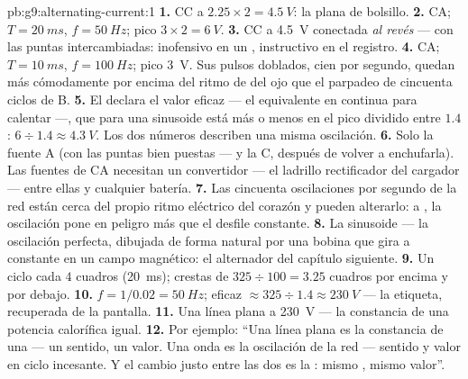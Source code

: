 \begin{solution}{pb:g9:alternating-current:1}
\textbf{1.} CC a $2.25 \times 2 = \qty{4.5}{V}$: la  plana de
bolsillo.
\textbf{2.} CA; $T = \qty{20}{ms}$, $f = \qty{50}{Hz}$; pico $3 \times
2 = \qty{6}{V}$.
\textbf{3.} CC a \qty{4.5}{V} conectada \emph{al revés} --- con las
puntas intercambiadas: inofensivo en un , instructivo en el
registro.
\textbf{4.} CA; $T = \qty{10}{ms}$, $f = \qty{100}{Hz}$; pico
\qty{3}{V}. Sus pulsos doblados, cien por segundo, quedan más
cómodamente por encima del ritmo de  del ojo que el parpadeo de
cincuenta ciclos de B.
\textbf{5.} El  declara el valor eficaz --- el
equivalente en continua para calentar ---, que para una sinusoide está
más o menos en el pico dividido entre $1.4$: $6 \div 1.4 \approx
\qty{4.3}{V}$. Los dos números describen una misma oscilación.
\textbf{6.} Solo la fuente A (con las puntas bien puestas --- y la C,
después de volver a enchufarla). Las fuentes de CA necesitan un
convertidor --- el ladrillo rectificador del cargador --- entre ellas y
cualquier batería.
\textbf{7.} Las cincuenta oscilaciones por segundo de la red están
cerca del propio ritmo eléctrico del corazón y pueden alterarlo:
 a , la oscilación pone en peligro más
que el desfile constante.
\textbf{8.} La sinusoide --- la oscilación perfecta, dibujada de forma
natural por una bobina que gira a  constante en un campo
magnético: el alternador del capítulo siguiente.
\textbf{9.} Un ciclo cada $4$ cuadros (\qty{20}{ms}); crestas de $325
\div 100 = 3.25$ cuadros por encima y por debajo.
\textbf{10.} $f = 1/0.02 = \qty{50}{Hz}$; eficaz $\approx 325 \div 1.4
\approx \qty{230}{V}$ --- la etiqueta, recuperada de la pantalla.
\textbf{11.} Una línea plana a \qty{230}{V} --- la constancia de una
potencia calorífica igual.
\textbf{12.} Por ejemplo: ``Una línea plana es la constancia de una
 --- un sentido, un valor. Una onda es la oscilación de la
red --- sentido y valor en ciclo incesante. Y el cambio justo entre las
dos es la : mismo , mismo valor''.
\end{solution}

